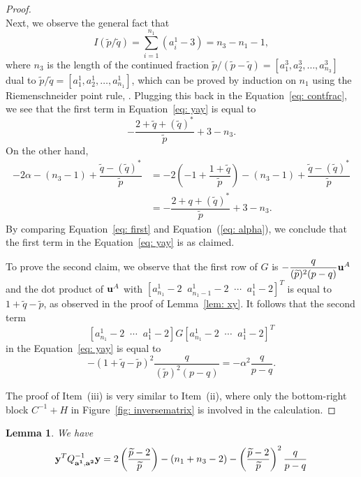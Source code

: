 \documentclass[11pt]{amsart}
\theoremstyle{plain}
\newtheorem{lemma}[theorem]{Lemma}
\theoremstyle{definition}
\theoremstyle{remark}
\numberwithin{theorem}{section}
\begin{document}
\begin{proof}
\begin{equation}
 \end{equation}
 Next, we observe the general fact that 
\[
I(\widetilde{p} /  \widetilde{q})= \sum_{i=1}^{n_1} (a^1_i -3) = n_3-n_1-1,
\] 
where $n_3$ is the length of the continued fraction $\widetilde{p}/(\widetilde{p}-\widetilde{q})=[a^3_1, a^3_2, \ldots, a^3_{n_3}]$ dual to $\widetilde{p}/\widetilde{q}=[a^1_1, a^1_2, \ldots, a^1_{n_1}]$, which can be proved by induction on $n_1$ using the Riemenschneider point rule, \cite{Riemenschneider1974}. Plugging this back in the Equation~\eqref{eq: contfrac}, we see that the first term in Equation~\eqref{eq: yay} is equal to 
\begin{equation} \label{eq: first}
 -\dfrac{2+\widetilde q+ (\widetilde{q})^*}{\widetilde{p}} + 3-n_3.
 \end{equation}
 On the other hand, 
 \begin{equation} \label{eq: alpha}
\begin{split}
 -2\alpha  -(n_3-1) + \dfrac{\widetilde{q} - (\widetilde{q})^*}{\widetilde{p}} &=  -2\left(-1 + \dfrac{1+\widetilde{q}}{\widetilde{p}} \right)  -(n_3-1) + \dfrac{\widetilde{q} - (\widetilde{q})^*}{\widetilde{p}}  \\
 & = -\dfrac{2+q+ (\widetilde{q})^*}{\widetilde{p}} + 3-n_3.  \end{split}
\end{equation}
By comparing Equation~\eqref{eq: first} and  Equation~(\ref{eq: alpha}), we conclude that the first term in the Equation~\eqref{eq: yay} is as claimed. 

To prove the second claim, we observe that the first row of $G$ is $-\dfrac{q}{(\widetilde{p})^2(p-q)} {\bf u}^A$ and the dot product of ${\bf u}^A$ with  $[a^1_{n_1}-2 \;\; a^1_{n_1-1}-2 \;\; \cdots \;\; a^1_1-2]^T$ is equal to $1 + \widetilde{q} - \widetilde{p}$, as observed in the proof of Lemma~\ref{lem: xy}.  It follows that the second term 
 \[
[a^1_{n_1}-2 \;\; \cdots \;\; a^1_1-2] G [a^1_{n_1}-2 \;\;  \cdots \;\; a^1_1-2]^T
 \]  
 in the Equation~\eqref{eq: yay} is equal to 
 \[
 -(1 + \widetilde{q} - \widetilde{p})^2 \dfrac{q}{(\widetilde{p})^2(p-q)}=- \alpha^2 \dfrac{q}{p-q}.
 \]
 
 The proof of Item~(iii) is very similar to Item~(ii), where only the bottom-right block $C^{-1} + H$  in Figure~\ref{fig: inversematrix} is involved in the calculation. 
\end{proof} 


\begin{lemma} \label{lem: yy} We have 
$${\bf y}^T Q^{-1}_{{\bf a^1}, {\bf a^2}} {\bf y}  = 2\left(\dfrac{\widetilde{p} -2}{\widetilde{p}} \right)- (n_1+n_3-2) - \left(\dfrac{\widetilde{p} -2}{\widetilde{p}} \right)^2 \dfrac{q}{p-q}$$
\end{lemma}
\end{document}
